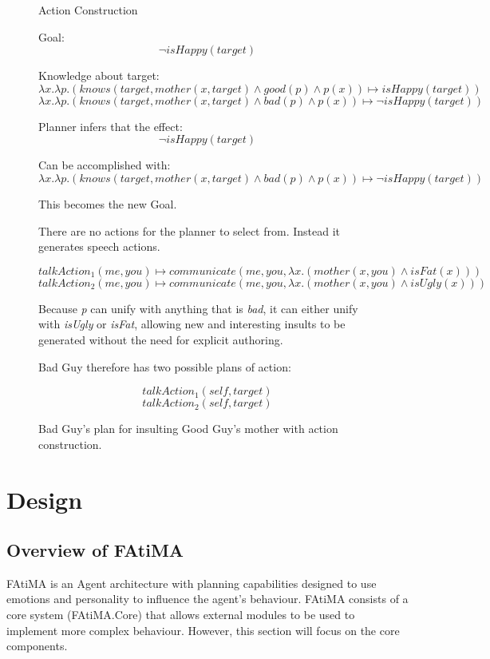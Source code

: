 \documentclass{article}
\begin{document}
\begin{figure}[h!]
  
  \begin{center}\large{Action Construction}\end{center}

  Goal:
  $$
  \neg isHappy(target)
  $$

  Knowledge about target:
  \[
  \lambda x.\lambda p.(knows(target, mother(x,target) \wedge good(p) \wedge p(x)) \mapsto isHappy(target))
  \]
  \[
  \lambda x.\lambda p.(knows(target, mother(x,target) \wedge bad(p) \wedge p(x)) \mapsto \neg isHappy(target))
  \]

  Planner infers that the effect:
  \[
  \neg isHappy(target)
  \]

  Can be accomplished with:
  \[
  \lambda x.\lambda p.(knows(target, mother(x,target) \wedge bad(p) \wedge p(x)) \mapsto \neg isHappy(target))
  \]

  This becomes the new Goal.

  There are no actions for the planner to select from.  Instead it generates speech
  actions.

  \[
  talkAction_1(me, you) \mapsto communicate(me, you, \lambda x.(mother(x, you) \wedge isFat(x)))
  \]
  \[
  talkAction_2(me, you) \mapsto communicate(me, you, \lambda x.(mother(x, you) \wedge isUgly(x)))
  \]

  Because \emph{p} can unify with anything that is \emph{bad}, it can either unify with
  \emph{isUgly} or \emph{isFat}, allowing new and interesting insults to be generated
  without the need for explicit authoring.

  Bad Guy therefore has two possible plans of action:

  \[
  talkAction_1(self, target)
  \]
  \[
  talkAction_2(self, target)
  \]

  \caption{Bad Guy's plan for insulting Good Guy's mother with action construction.}
  \label{plan_construction}
\end{figure}

\section{Design}

\subsection{Overview of FAtiMA}

FAtiMA is an Agent architecture with planning capabilities designed to use emotions
and personality to influence the agent's behaviour\cite{Mascarenhas}.  FAtiMA consists
of a core system (FAtiMA.Core) that allows external modules to be used to implement more
complex behaviour.  However, this section will focus on the core components.
\end{document}
